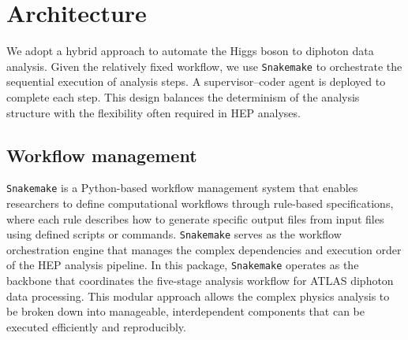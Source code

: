 \documentclass[aps,prd,reprint,superscriptaddress]{revtex4-2}
\begin{document}


\section{Architecture}

We adopt a hybrid approach to automate the Higgs boson to diphoton data analysis. Given the relatively fixed workflow, we use \texttt{Snakemake} to orchestrate the sequential execution of analysis steps. A supervisor–coder agent is deployed to complete each step. This design balances the determinism of the analysis structure with the flexibility often required in HEP analyses. 

\subsection{Workflow management}
\texttt{Snakemake} is a Python-based workflow management system that enables researchers to define computational workflows through rule-based specifications, where each rule describes how to generate specific output files from input files using defined scripts or commands. \texttt{Snakemake} serves as the workflow orchestration engine that manages the complex dependencies and execution order of the HEP analysis pipeline.  In this package, \texttt{Snakemake} operates as the backbone that coordinates the five-stage analysis workflow for ATLAS diphoton data processing. This modular approach allows the complex physics analysis to be broken down into manageable, interdependent components that can be executed efficiently and reproducibly.
\end{document}
